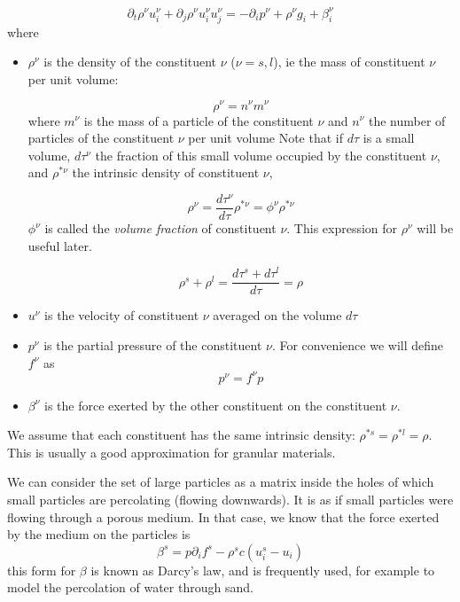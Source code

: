 \begin{equation} \label{eq:mom_bal}
	\partial_t \rho^\nu u_i^\nu + \partial_j \rho^\nu u_i^\nu u_j^\nu = -\partial_i p^\nu + \rho^\nu g_i + \beta^\nu_i 
\end{equation}
where
\begin{itemize}
\item $\rho^\nu$ is the density of the constituent $\nu$ ($\nu = s,l$), ie the mass of constituent $\nu$ per unit volume:

\[
\rho^\nu = n^\nu m^\nu
\]
where $m^\nu$ is the mass of a particle of the constituent $\nu$ and $n^\nu$ the number of particles of the constituent $\nu$ per unit volume
Note that if $d\tau$ is a small volume, $d\tau^\nu$ the fraction of this small volume occupied by the constituent $\nu$, and $\rho^{*\nu}$ the intrinsic density of constituent $\nu$, 

\begin{equation} \label{eq:1}
\rho^\nu = \frac{d\tau^\nu}{d\tau} \rho^{*\nu} = \phi^{\nu} \rho^{*\nu}
\end{equation}
$\phi^\nu$ is called the \textit{volume fraction} of constituent $\nu$. This expression for $\rho^\nu$ will be useful later.

\[
\rho^s + \rho^l = \frac{d\tau^s + d\tau^l}{d\tau} = \rho
\]

\item $u^\nu$ is the velocity of constituent $\nu$ averaged on the volume $d\tau$

\item $p^\nu$ is the partial pressure of the constituent $\nu$. For convenience we will define $f^\nu$ as
\begin{equation}
p^\nu = f^\nu p
\end{equation}

\item $\beta^\nu$ is the force exerted by the other constituent on the constituent $\nu$.
\end{itemize}

We assume that each constituent has the same intrinsic density: $\rho^{*s}=\rho^{*l}=\rho$. This is usually a good approximation for granular materials.

We can consider the set of large particles as a matrix inside the holes of which small particles are percolating (flowing downwards).
It is as if small particles were flowing through a porous medium. In that case, we know that the force exerted by the medium on the particles is 
\begin{equation}
\beta^s = p \partial_i f^s - \rho^s c (u^s_i - u_i)
\end{equation}
this form for $\beta$ is known as Darcy's law, and is frequently used, for example to model the percolation of water through sand.

